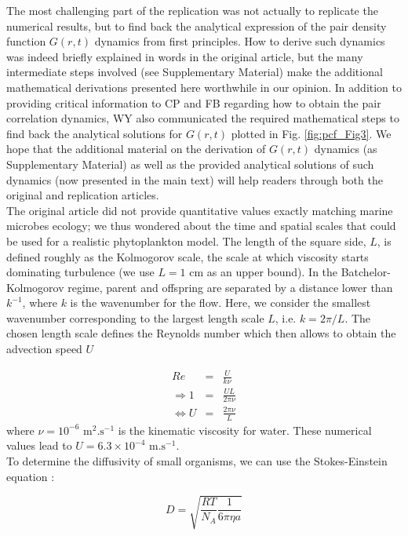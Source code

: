 The most challenging part of the replication was not actually to replicate the numerical results, but to find back the analytical expression of the pair density function $G(r,t)$ dynamics from first principles. How to derive such dynamics was indeed briefly explained in words in the original article, but the many intermediate steps involved (see Supplementary Material) make the additional mathematical derivations presented here worthwhile in our opinion. In addition to providing critical information to CP and FB regarding how to obtain the pair correlation dynamics, WY also communicated the required mathematical steps to find back the analytical solutions for $G(r,t)$ plotted in Fig. \ref{fig:pcf_Fig3}. We hope that the additional material on the derivation of $G(r,t)$ dynamics (as Supplementary Material) as well as the provided analytical solutions of such dynamics (now presented in the main text) will help readers through both the original and replication articles. \\

The original article did not provide quantitative values exactly matching marine microbes ecology; we thus wondered about the time and spatial scales that could be used for a realistic phytoplankton model. The length of the square side, $L$, is defined roughly as the Kolmogorov scale, the scale at which viscosity starts dominating turbulence  (we use $L= 1$ cm as an upper bound). In the Batchelor-Kolmogorov regime, parent and offspring are separated by a distance lower than $k^{-1}$, where $k$ is the wavenumber for the flow. Here, we consider the smallest wavenumber corresponding to the largest length scale $L$, i.e. $k=2\pi/L$. The chosen length scale defines the Reynolds number which then allows to obtain the advection speed $U$
 
\begin{eqnarray}
 Re & = &\frac{U}{k\nu}\\
\Rightarrow 1 & = & \frac{UL}{2\pi\nu}\\
\Leftrightarrow U & = &\frac{2\pi\nu}{L}
\end{eqnarray}
% 
where $\nu=10^{-6} \text{ m}^{2}.\text{s}^{-1}$ is the kinematic viscosity for water. These numerical values lead to $U=6.3\times10^{-4} \text{ m.s}^{-1}$.\\

To determine the diffusivity of small organisms, we can use the Stokes-Einstein equation \citep{einstein1905molekularkinetischen}:

\begin{equation}
 D=\sqrt{\frac{RT}{N_{A}}\frac{1}{6\pi\eta a}}
\end{equation}

